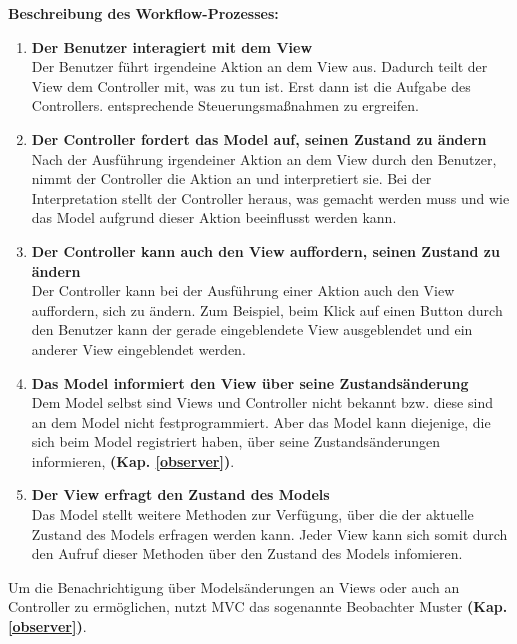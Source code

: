 \textbf{Beschreibung des Workflow-Prozesses:}
\begin{enumerate}
\item \textbf{Der Benutzer interagiert mit dem View}\\
Der Benutzer führt irgendeine Aktion an dem View aus. Dadurch teilt der View dem Controller mit, was zu tun ist. Erst dann ist die Aufgabe des Controllers. entsprechende Steuerungsmaßnahmen zu ergreifen.

\item  \textbf{Der Controller fordert das Model auf, seinen Zustand zu ändern}\\
Nach der Ausführung irgendeiner Aktion an dem View durch den Benutzer, nimmt der Controller die Aktion an und interpretiert sie. Bei der Interpretation stellt der Controller heraus, was gemacht werden muss und wie das Model aufgrund dieser Aktion beeinflusst werden kann.

\item  \textbf{Der Controller kann auch den View auffordern, seinen Zustand zu ändern}\\
Der Controller kann bei der Ausführung einer Aktion auch den View auffordern, sich zu ändern. Zum Beispiel, beim Klick auf einen Button durch den Benutzer kann der gerade eingeblendete View ausgeblendet und ein anderer View eingeblendet werden.

\item  \textbf{Das Model informiert den View über seine Zustandsänderung}\\
Dem Model selbst sind Views und Controller nicht bekannt bzw. diese sind an dem Model nicht festprogrammiert. Aber das Model kann diejenige, die sich beim Model registriert haben, über seine Zustandsänderungen informieren, \textbf{(Kap. \ref{observer})}.

\item  \textbf{Der View erfragt den Zustand des Models}\\
Das Model stellt weitere Methoden zur Verfügung, über die der aktuelle Zustand des Models erfragen werden kann. 
Jeder View kann sich somit durch den Aufruf dieser Methoden über den Zustand des Models infomieren.

\end{enumerate}
Um die Benachrichtigung über Modelsänderungen an Views oder auch an Controller zu ermöglichen, nutzt MVC das sogenannte Beobachter Muster \textbf{(Kap. \ref{observer})}.

